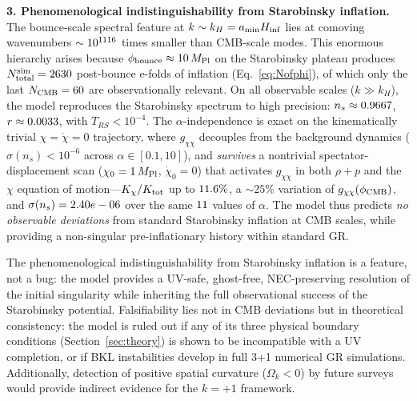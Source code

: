 \documentclass[11pt,a4paper]{article}
\begin{document}
\textbf{3. Phenomenological indistinguishability from Starobinsky inflation.} The bounce-scale spectral feature at $k \sim k_H = a_{\rm min} H_{\rm inf}$ lies at comoving wavenumbers $\sim 10^{1116}$ times smaller than CMB-scale modes. This enormous hierarchy arises because $\phi_{\rm bounce} \approx 10\,M_{\rm Pl}$ on the Starobinsky plateau produces $N_{\rm total}^{\rm sim} = 2630$ post-bounce e-folds of inflation (Eq.~\eqref{eq:Nofphi}), of which only the last $N_{\rm CMB} = 60$ are observationally relevant. On all observable scales ($k \gg k_H$), the model reproduces the Starobinsky spectrum to high precision: $n_s \approx 0.9667$, $r \approx 0.0033$, with $T_{RS} < 10^{-4}$. The $\alpha$-independence is exact on the kinematically trivial $\chi = \dot\chi = 0$ trajectory, where $g_{\chi\chi}$ decouples from the background dynamics ($\sigma(n_s) < 10^{-6}$ across $\alpha \in [0.1, 10]$), and \emph{survives} a nontrivial spectator-displacement scan ($\chi_0 = 1\,M_{\rm Pl}$, $\dot\chi_0 = 0$) that activates $g_{\chi\chi}$ in both $\rho+p$ and the $\chi$ equation of motion---$K_\chi/K_{\rm tot}$ up to $11.6\%$, a $\sim\!25\%$ variation of $g_{\chi\chi}(\phi_{\rm CMB})$, and $\sigma(n_s) = 2.40e-06$ over the same $11$ values of $\alpha$. The model thus predicts \emph{no observable deviations} from standard Starobinsky inflation at CMB scales, while providing a non-singular pre-inflationary history within standard GR.

The phenomenological indistinguishability from Starobinsky inflation is a feature, not a bug: the model provides a UV-safe, ghost-free, NEC-preserving resolution of the initial singularity while inheriting the full observational success of the Starobinsky potential. Falsifiability lies not in CMB deviations but in theoretical consistency: the model is ruled out if any of its three physical boundary conditions (Section~\ref{sec:theory}) is shown to be incompatible with a UV completion, or if BKL instabilities develop in full 3+1 numerical GR simulations. Additionally, detection of positive spatial curvature ($\Omega_k < 0$) by future surveys would provide indirect evidence for the $k=+1$ framework.
\end{document}
